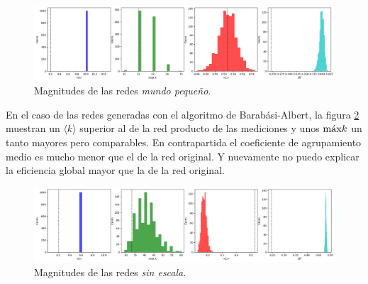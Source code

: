 \documentclass{article}
\begin{document}
\begin{figure}[ht]
  \centering
  \includegraphics[width= \linewidth]{hist_small_world}
  \caption{Magnitudes de las redes \emph{mundo pequeño}.}
	\label{fg:hist_small_world}
\end{figure}

En el caso de las redes generadas con el algoritmo de Barabási-Albert, la figura \ref{fg:hist_scale_free} muestran un $\langle k \rangle$ superior al de la red producto de las mediciones y unos $\textnormal{máx} k$ un tanto mayores pero comparables.
En contrapartida el coeficiente de agrupamiento medio es mucho menor que el de la red original.
Y nuevamente no puedo explicar la eficiencia global mayor que la de la red original.

\begin{figure}[ht]
  \centering
  \includegraphics[width= \linewidth]{hist_scale_free}
  \caption{Magnitudes de las redes \emph{sin escala}.}
	\label{fg:hist_scale_free}
\end{figure}





\printbibliography[title= Referencias, heading=bibintoc]
\end{document}
